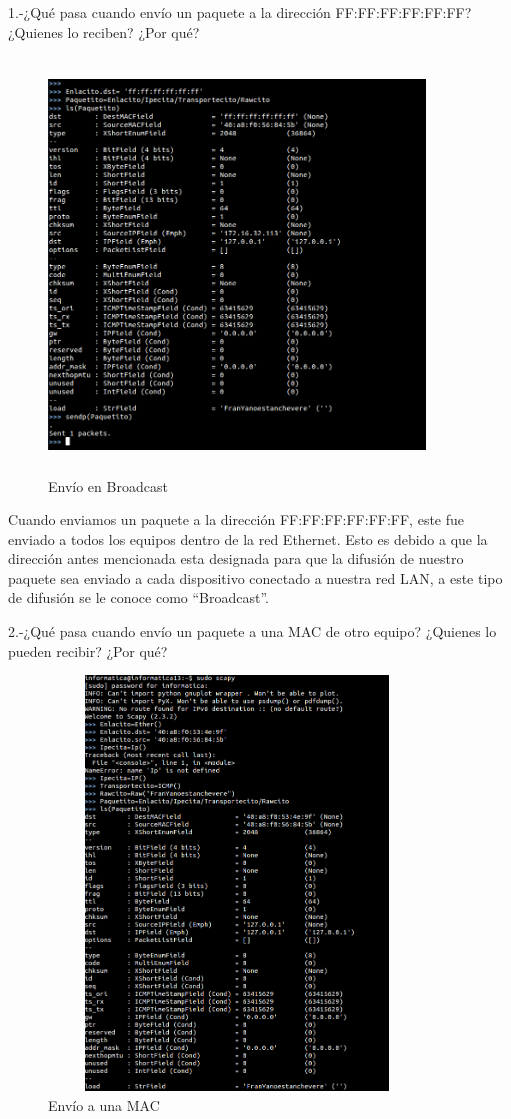 \documentclass{udpreport}
\begin{document}
	  1.-¿Qué pasa cuando envío un paquete a la dirección FF:FF:FF:FF:FF:FF? ¿Quienes
	     lo reciben? ¿Por qué?\\
    	 	\begin{figure}[h]
	        	\includegraphics[width=10cm, height=11cm]{PaqueteMacConocida.png}
			\caption{Envío en Broadcast}
	 	\end{figure}
	     Cuando enviamos un paquete a la dirección FF:FF:FF:FF:FF:FF, este fue enviado a todos los equipos dentro de la red
	     Ethernet. Esto es debido a que la dirección antes mencionada esta designada para que la difusión de nuestro paquete sea
 	     enviado a cada dispositivo conectado a nuestra red LAN, a este tipo de difusión se le conoce como “Broadcast”.\\
 	     \newpage
 
  	  2.-¿Qué pasa cuando envío un paquete a una MAC de otro equipo? ¿Quienes lo
  	      pueden recibir? ¿Por qué?\\
    		\begin{figure}[h]
  	          	\includegraphics[width=10cm, height=11cm]{PaqueteOtraRed.png}
  	          	\caption{Envío a una MAC}
  		\end{figure}
 	      
\end{document}
